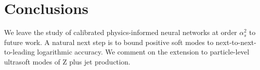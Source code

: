 \section{Conclusions}\label{sec:conclusions}

We leave the study of calibrated physics-informed neural networks at
order $\alpha_s^2$ to future work. A natural next step is to bound
positive soft modes to next-to-next-to-leading logarithmic accuracy. We
comment on the extension to particle-level ultrasoft modes of Z plus jet
production.


